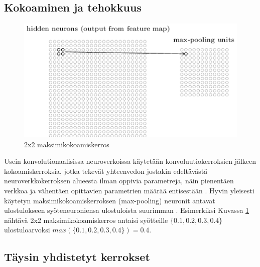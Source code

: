 \documentclass[finnish]{tktltiki2}
\theoremstyle{definition}
\theoremstyle{remark}
\begin{document}
    \subsection{Kokoaminen ja tehokkuus}
      \begin{figure}[h]
        \centering
        \includegraphics[scale=0.5]{max-pooling}
        \caption{2x2 maksimikokoamiskerros \cite{Nielsen-neural}}
        \label{pic:max-pooling}
      \end{figure}
      Usein konvolutionaalisissa neuroverkoissa käytetään konvoluutiokerroksien jälkeen kokoamiskerroksia, jotka tekevät yhteenvedon jostakin edeltävästä neuroverkkokerroksen alueesta ilman oppivia parametreja, näin pienentäen verkkoa ja vähentäen opittavien parametrien määrää entisestään \cite{Nielsen-neural}. Hyvin yleisesti käytetyn maksimikokoamiskerroksen (max-pooling) neuronit antavat ulostulokseen syöteneuroniensa ulostuloista suurimman \cite{KSHimagenet2012}. Esimerkiksi Kuvassa \ref{pic:max-pooling} nähtävä 2x2 maksimikokoamiskerros antaisi syötteille $\{0.1, 0.2, 0.3, 0.4\}$ ulostuloarvoksi $max(\{0.1, 0.2, 0.3, 0.4\}) = 0.4.$

    \subsection{Täysin yhdistetyt kerrokset}
\end{document}
